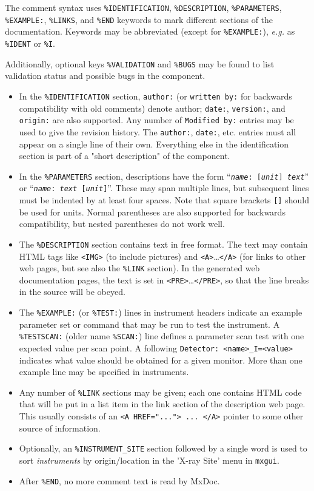 The comment syntax uses \verb+%IDENTIFICATION+, \verb+%DESCRIPTION+,
\verb+%PARAMETERS+, \verb+%EXAMPLE:+, \verb+%LINKS+, and \verb+%END+
keywords to mark different sections of the documentation. Keywords may
be abbreviated (except for \verb+%EXAMPLE:+), \textit{e.g.} as \verb+%IDENT+ or \verb+%I+.

Additionally, optional keys \verb+%VALIDATION+ and \verb+%BUGS+ may be found to list validation status and possible bugs in the component.

\begin{itemize}
\item In the \verb+%IDENTIFICATION+
  section, \verb+author:+ (or \verb+written by:+ for backwards
  compatibility with old comments) denote author; \verb+date:+,
  \verb+version:+, and \verb+origin:+ are also supported. Any number of
  \verb+Modified by:+ entries may be used to give the revision history.
  The \verb+author:+, \verb+date:+, etc. entries must all
  appear on a single line of their own. Everything else in the
  identification section is part of a "short description" of the
  component.
\item In the \verb+%PARAMETERS+
  section, descriptions have the form
  \hbox{``\texttt{\textit{name\/}:~[\textit{unit\/}] \textit{text\/}}''}
  or \hbox{``\texttt{\textit{name\/}:~\textit{text\/} [\textit{unit\/}]}''}.
  These may span multiple lines, but subsequent lines must be
  indented by at least four spaces. Note that square brackets \verb+[]+ should
  be used for units. Normal parentheses are also supported for backwards
  compatibility, but nested parentheses do not work well.
\item The \verb+%DESCRIPTION+
  section contains text in free format. The text may contain HTML tags
  like \verb+<IMG>+ (to include pictures) and
  \verb+<A>+\ldots\verb+</A>+
  (for links to other web pages, but see also the \verb+%LINK+
  section). In the generated web documentation pages, the text is set in
  \verb+<PRE>+\ldots\verb+</PRE>+, so that the line breaks in the source
  will be obeyed.
\item The \verb+%EXAMPLE:+ (or \verb+%TEST:+)
  lines in instrument headers indicate an example parameter set or command that may be
  run to test the instrument. A \verb+%TESTSCAN:+ (older name \verb+%SCAN:+) line defines a parameter scan test with one expected value per scan point. A following \verb+Detector: <name>_I=<value>+
  indicates what value should be obtained for a given monitor. More than one example 
  line may be specified in instruments.
\item Any number of \verb+%LINK+
  sections may be given; each one contains HTML code that will be put in
  a list item in the link section of the description web page. This
  usually consists of an \verb+<A HREF="..."> ... </A>+ pointer to some
  other source of information.
\item Optionally, an \verb+%INSTRUMENT_SITE+ section followed by a single word is used to sort \emph{instruments} by origin/location in the 'X-ray Site' menu in \verb+mxgui+.
\item After \verb+%END+, no more comment text is read by MxDoc.
\end{itemize}
